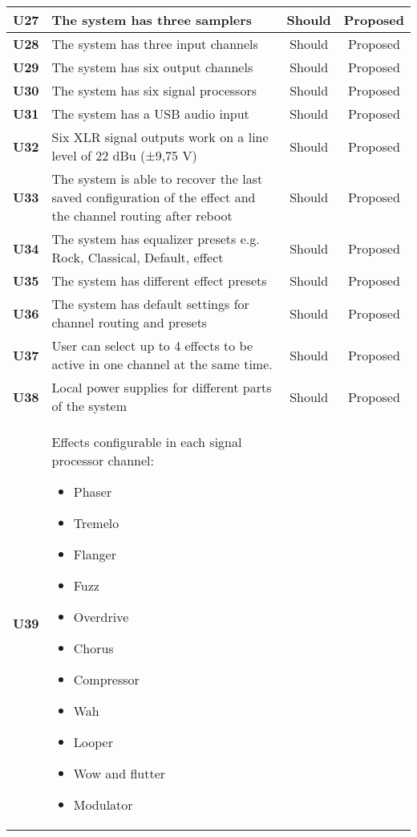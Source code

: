 \begin{longtable}{|c|p{10cm}|c|c|}
	\textbf{U27} &The system has three samplers 																				& Should & Proposed\\ \hline
	\textbf{U28} &The system has three input channels 																			& Should & Proposed\\ \hline
	\textbf{U29} &The system has six output channels 																			& Should & Proposed\\ \hline
	\textbf{U30} &The system has six signal processors 																			& Should & Proposed\\ \hline
	\textbf{U31} &The system has a USB audio input					 															& Should & Proposed\\ \hline
	\textbf{U32} &Six XLR signal outputs work on a line level of 22 dBu (±9,75 V) 												& Should & Proposed\\ \hline
	\textbf{U33} &The system is able to recover the last saved configuration of the effect and the channel routing after reboot	& Should & Proposed\\ \hline
	\textbf{U34} &The system has equalizer presets e.g. Rock, Classical, Default, effect		 								& Should & Proposed\\ \hline
	\textbf{U35} &The system has different effect presets										 								& Should & Proposed\\ \hline
	\textbf{U36} &The system has default settings for channel routing and presets							 					& Should & Proposed\\ \hline
	\textbf{U37} &User can select up to 4 effects to be active in one channel at the same time. 								& Should & Proposed\\ \hline
	\textbf{U38} &Local power supplies for different parts of the system 														& Should & Proposed\\ \hline
	\textbf{U39} &Effects configurable in each signal processor channel:\newline
	\begin{itemize}
		\setlength\itemsep{-0.3em}
		\item Phaser
		\item Tremelo
		\item Flanger
		\item Fuzz
		\item Overdrive
		\item Chorus
		\item Compressor
		\item Wah
		\item Looper
		\item Wow and flutter
		\item Modulator

\end{itemize}
\end{longtable}
